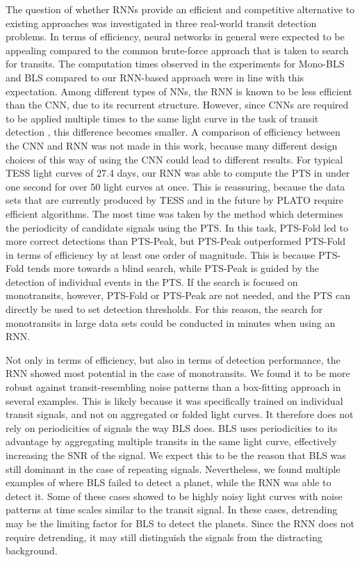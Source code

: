 The question of whether RNNs provide an efficient and competitive alternative to existing approaches was investigated in three real-world transit detection problems. In terms of efficiency, neural networks in general were expected to be appealing compared to the common brute-force approach that is taken to search for transits. The computation times observed in the experiments for Mono-BLS and BLS compared to our RNN-based approach were in line with this expectation. Among different types of NNs, the RNN is known to be less efficient than the CNN, due to its recurrent structure. However, since CNNs are required to be applied multiple times to the same light curve in the task of transit detection \cite{pearson2018searching}, this difference becomes smaller. A comparison of efficiency between the CNN and RNN was not made in this work, because many different design choices of this way of using the CNN could lead to different results. For typical TESS light curves of 27.4 days, our RNN was able to compute the PTS in under one second for over 50 light curves at once. This is reassuring, because the data sets that are currently produced by TESS and in the future by PLATO require efficient algorithms. The most time was taken by the method which determines the periodicity of candidate signals using the PTS. In this task, PTS-Fold led to more correct detections than PTS-Peak, but PTS-Peak outperformed PTS-Fold in terms of efficiency by at least one order of magnitude. This is because PTS-Fold tends more towards a blind search, while PTS-Peak is guided by the detection of individual events in the PTS. If the search is focused on monotransits, however, PTS-Fold or PTS-Peak are not needed, and the PTS can directly be used to set detection thresholds. For this reason, the search for monotransits in large data sets could be conducted in minutes when using an RNN.

Not only in terms of efficiency, but also in terms of detection performance, the RNN showed most potential in the case of monotransits. We found it to be more robust against transit-resembling noise patterns than a box-fitting approach in several examples. This is likely because it was specifically trained on individual transit signals, and not on aggregated or folded light curves. It therefore does not rely on periodicities of signals the way BLS does. BLS uses periodicities to its advantage by aggregating multiple transits in the same light curve, effectively increasing the SNR of the signal. We expect this to be the reason that BLS was still dominant in the case of repeating signals. Nevertheless, we found multiple examples of where BLS failed to detect a planet, while the RNN was able to detect it. Some of these cases showed to be highly noisy light curves with noise patterns at time scales similar to the transit signal. In these cases, detrending may be the limiting factor for BLS to detect the planets. Since the RNN does not require detrending, it may still distinguish the signals from the distracting background.

